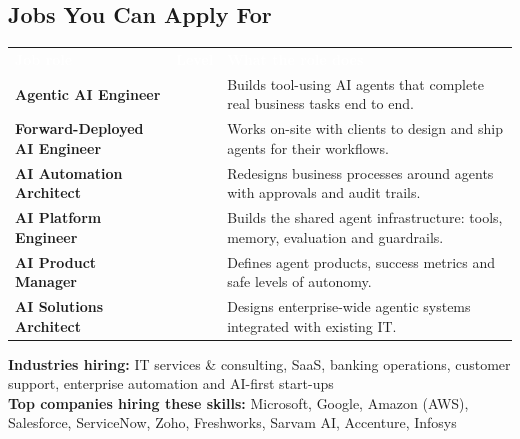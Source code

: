 \documentclass[10pt,a4paper]{article}
\newcommand{\hdr}{\rowcolor{navy}}
\newcommand{\hw}[1]{\textcolor{white}{\bfseries #1}}
\begin{document}
\subsection*{Jobs You Can Apply For}
\par{\small\begin{tabularx}{\linewidth}{@{}>{\raggedright\arraybackslash}p{4.6cm}>{\raggedright\arraybackslash}p{2.5cm}Y@{}}\hdr\hw{Job role}&\hw{Level}&\hw{What the role does}\\
\textbf{Agentic AI Engineer} &  & Builds tool-using AI agents that complete real business tasks end to end.\\
\textbf{Forward-Deployed AI Engineer} &  & Works on-site with clients to design and ship agents for their workflows.\\
\textbf{AI Automation Architect} &  & Redesigns business processes around agents with approvals and audit trails.\\
\textbf{AI Platform Engineer} &  & Builds the shared agent infrastructure: tools, memory, evaluation and guardrails.\\
\textbf{AI Product Manager} &  & Defines agent products, success metrics and safe levels of autonomy.\\
\textbf{AI Solutions Architect} &  & Designs enterprise-wide agentic systems integrated with existing IT.\\
\end{tabularx}}
{\small\textbf{Industries hiring:} IT services \& consulting, SaaS, banking operations, customer support, enterprise automation and AI-first start-ups\\[2pt]\textbf{Top companies hiring these skills:} Microsoft, Google, Amazon (AWS), Salesforce, ServiceNow, Zoho, Freshworks, Sarvam AI, Accenture, Infosys}
\end{document}
